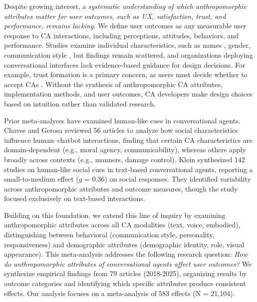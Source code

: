 \documentclass[sigconf,review,anonymous]{acmart}
\begin{document}
Despite growing interest, a \textit{systematic understanding of which anthropomorphic attributes matter for user outcomes, such as UX, satisfaction, trust, and performance, remains lacking}. We define user outcomes as any measurable user response to CA interactions, including perceptions, attitudes, behaviors, and performance. Studies examine individual characteristics, such as names \citep{go2019humanizing}, gender, communication style \citep{seeger2021texting}, but findings remain scattered, and organizations deploying conversational interfaces lack evidence-based guidance for design decisions. For example, trust formation is a primary concern, as users must decide whether to accept CAs \citep{meyer2023leverage,følstad2021chatbots,nordheim2019trust}. Without the synthesis of anthropomorphic CA attributes, implementation methods, and user outcomes, CA developers make design choices based on intuition rather than validated research.

Prior meta-analyses have examined human-like cues in conversational agents. Chaves and Gerosa \cite{chaves2021should} reviewed 56 articles to analyze how social characteristics influence human–chatbot interactions, finding that certain CA characteristics are domain-dependent (e.g., moral agency, communicability), whereas others apply broadly across contexts (e.g., manners, damage control). Klein \cite{klein_effects_2025} synthesized 142 studies on human-like social cues in text-based conversational agents, reporting a small-to-medium effect ($g$ = 0.36) on social responses. They identified variability across anthropomorphic attributes and outcome measures, though the study focused exclusively on text-based interactions. 

Building on this foundation, we extend this line of inquiry by examining anthropomorphic attributes across all CA modalities (text, voice, embodied), distinguishing between behavioral (communication style, personality, responsiveness) and demographic attributes (demographic identity, role, visual appearance). %
This meta-analysis addresses the following research question: 
\textit{How do anthropomorphic attributes of conversational agents affect user outcomes?} 
We synthesize empirical findings from 79 articles (2018-2025), organizing results by outcome categories and identifying which specific attributes produce consistent effects. Our analysis focuses on a meta-analysis of 583 effects (N = 21,104). %
\end{document}

